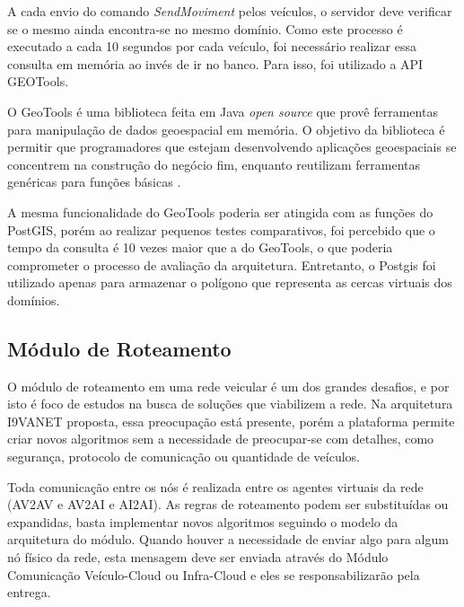 \documentclass[
	12pt,				%
	oneside,			%
	a4paper,			%
	english,			%
	brazil				%
	]{abntex2ppgsi}
\begin{document}
A cada envio do comando \textit{SendMoviment} pelos veículos, o servidor deve verificar se o mesmo ainda encontra-se no mesmo domínio. Como este processo é executado a cada 10 segundos por cada veículo, foi necessário realizar essa consulta em memória ao invés de ir no banco. Para isso, foi utilizado a API GEOTools.

O GeoTools é uma biblioteca feita em Java \textit{open source} que provê ferramentas para manipulação de dados geoespacial em memória. O objetivo da biblioteca é permitir que programadores que estejam desenvolvendo aplicações geoespaciais se concentrem na construção do negócio fim, enquanto reutilizam ferramentas genéricas para funções básicas \cite{hall2008open}.

A mesma funcionalidade do GeoTools poderia ser atingida com as funções do PostGIS, porém ao realizar pequenos testes comparativos, foi percebido que o tempo da consulta é 10 vezes maior que a do GeoTools, o que poderia comprometer o processo de avaliação da arquitetura. Entretanto, o Postgis foi utilizado apenas para armazenar o polígono que representa as cercas virtuais dos domínios.


\subsection{Módulo de Roteamento}

O módulo de roteamento em uma rede veicular é um dos grandes desafios, e por isto é foco de estudos na busca de soluções que viabilizem a rede. Na arquitetura I9VANET proposta, essa preocupação está presente, porém a plataforma permite criar novos algoritmos sem a necessidade de preocupar-se com detalhes, como segurança, protocolo de comunicação ou quantidade de veículos.

Toda comunicação entre os nós é realizada entre os agentes virtuais da rede (AV2AV e AV2AI e AI2AI). As regras de roteamento podem ser substituídas ou expandidas, basta implementar novos algoritmos seguindo o modelo da arquitetura do módulo. Quando houver a necessidade de enviar algo para algum nó físico da rede, esta mensagem deve ser enviada através do Módulo Comunicação Veículo-Cloud ou Infra-Cloud e eles se responsabilizarão pela entrega.

\end{document}
